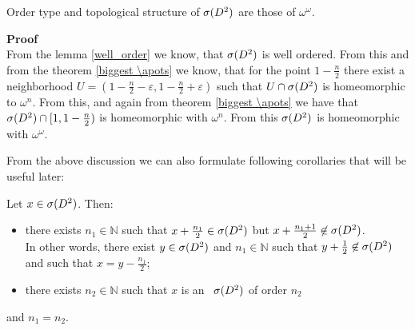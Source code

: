 \begin{theorem}
Order type and topological structure of ${\mathcal{\sigma}(D^2)}$ are those of $\omega^\omega$. 
\end{theorem}

\textbf{Proof} \\
From the lemma \ref{well_order} we know, that ${\mathcal{\sigma}(D^2)}$ is well ordered. From this and 
from the theorem \ref{biggest \apots} we know, that for the point $1-\frac{n}{2}$ there exist 
a neighborhood $U=(1-\frac{n}{2}-\varepsilon,1-\frac{n}{2}+\varepsilon)$ such that $U \cap 
{\mathcal{\sigma}(D^2)}$ is homeomorphic to $\omega^n$. From this, and again from theorem \ref{biggest \apots} 
we have that ${\mathcal{\sigma}(D^2)} \cap [1,1-\frac{n}{2})$ is homeomorphic with $\omega^n$. 
From this ${\mathcal{\sigma}(D^2)}$ is homeomorphic with $\omega^\omega$.

From the above discussion we can also formulate following corollaries that will be useful later:

\begin{corollary}\label{predescors}
Let $x \in {\mathcal{\sigma}(D^2)}$. Then:
\begin{itemize}
\item there exists $n_1 \in \mathbb{N}$ such that $x + \frac{n_1}{2} \in {\mathcal{\sigma}(D^2)}$ 
but $x+\frac{n_1+1}{2} \not\in {\mathcal{\sigma}(D^2)}$. \\ In other words, there exist $y \in {\mathcal{\sigma}(D^2)}$ and 
$n_1 \in \mathbb{N}$ such that 
$y + \frac{1}{2} \not\in {\mathcal{\sigma}(D^2)}$ and such that $x = y - \frac{n_1}{2}$;
\item there exists $n_2 \in \mathbb{N}$ such that $x$ is an \apots\ ${\mathcal{\sigma}(D^2)}$ of 
order $n_2$
\end{itemize}
and $n_1 = n_2$.
\end{corollary}




